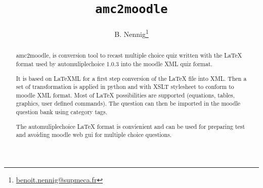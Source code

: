 \documentclass[a4paper]{article}
\title{\texttt{amc2moodle}}
\author{B. Nennig\footnote{\url{benoit.nennig@supmeca.fr}}}
\begin{document}
\maketitle 

\begin{abstract}
amc2moodle, is conversion tool to recast multiple choice quiz written with the LaTeX format used by automuliplechoice 1.0.3 into the moodle XML quiz format.

It is based on LaTeXML for a first step conversion of the LaTeX file into XML. Then a set of transformation is applied in python and with XSLT stylesheet to conform to moodle XML format. Most of LaTeX possibilities are supported (equations, tables, graphics, user defined commands). The question can then be imported in the moodle question bank using category tags.

The automuliplechoice LaTeX format is convienient and can be used for preparing test and avoiding moodle web gui for multiple choice questions.
\end{abstract}


\tableofcontents	
\newpage
\end{document}
